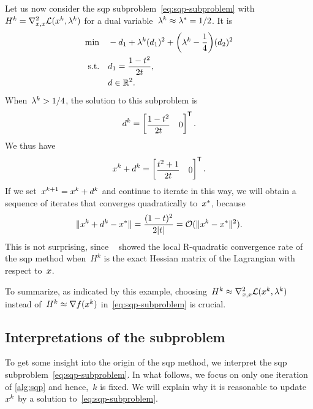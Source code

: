 Let us now consider the \gls{sqp} subproblem~\cref{eq:sqp-subproblem} with~$H^k = \nabla_{x, x}^2 \lag(\iter[k], \lm[k])$ for a dual variable~$\lm[k] \approx \lm[\ast] = 1/2$.
It is
\begin{align*}
    \min        & \quad -\step_1 + \lm[k] (\step_1)^2 + \bigg( \lm[k] - \frac{1}{4} \bigg) (\step_2)^2\\
    \text{s.t.} & \quad \step_1 = \frac{1 - t^2}{2 t},\\
                & \quad \step \in \R^2. \nonumber
\end{align*}
When~$\lm[k] > 1/4$, the solution to this subproblem is
\begin{equation*}
    \step[k] =
    \begin{bmatrix}
        \dfrac{1 - t^2}{2 t}    & 0
    \end{bmatrix}^{\T}.
\end{equation*}
We thus have
\begin{equation*}
    \iter[k] + \step[k] = 
    \begin{bmatrix}
        \dfrac{t^2 + 1}{2 t}  & 0
    \end{bmatrix}^{\T}.
\end{equation*}
If we set~$\iter[k + 1] = \iter[k] + \step[k]$ and continue to iterate in this way, we will obtain a sequence of iterates that converges quadratically to~$\iter[\ast]$, because
\begin{equation*}
    \norm{\iter[k] + \step[k] - \iter[\ast]} = \frac{(1 - t)^2}{2 \abs{t}} = \bigo(\norm{\iter[k] - \iter[\ast]}^2).
\end{equation*}
This is not surprising, since \citeauthor{Robinson_1974}~\cite{Robinson_1974} showed the local R-quadratic convergence rate of the \gls{sqp} method when~$H^k$ is the exact Hessian matrix of the Lagrangian with respect to~$\iter$.

To summarize, as indicated by this example, choosing~$H^k \approx \nabla_{x, x}^2 \lag(\iter[k], \lm[k])$ instead of~$H^k \approx \nabla \obj(\iter[k])$ in~\cref{eq:sqp-subproblem} is crucial.

\subsection{Interpretations of the  subproblem}
\label{subsec:sqp-interpretation}

To get some insight into the origin of the \gls{sqp} method, we interpret the \gls{sqp} subproblem~\cref{eq:sqp-subproblem}.
In what follows, we focus on only one iteration of \cref{alg:sqp} and hence,~$k$ is fixed.
We will explain why it is reasonable to update~$\iter[k]$ by a solution to~\cref{eq:sqp-subproblem}.


